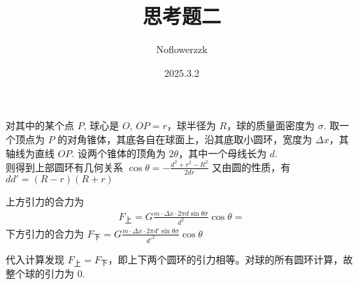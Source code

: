 \documentclass{article}
\title{思考题二}
\author{Noflowerzzk}
\date{2025.3.2}
\begin{document}
\maketitle

对其中的某个点 $P$, 球心是 $O$, $OP = r$，球半径为 $R$，球的质量面密度为 $\sigma$. 取一个顶点为 $P$ 的对角锥体，其底各自在球面上，沿其底取小圆环，宽度为 $\Delta x$，其轴线为直线 $OP$. 设两个锥体的顶角为 $2\theta$，其中一个母线长为 $d$. \\
则得到上部圆环有几何关系 
   $ \cos \theta = - \frac{d^2 + r^2 - R^2}{2dr} $
又由圆的性质，有 $d d' = (R - r) (R + r)$

上方引力的合力为 
\begin{align*}
    F_{\text{上}} = G\frac{m \cdot \Delta x \cdot 2\pi d\sin \theta \sigma}{d^2}\cos \theta = 
\end{align*}
下方引力的合力为 $F_{\text{下}} = G\frac{m \cdot \Delta x \cdot 2\pi d'\sin \theta \sigma}{d'^2}\cos \theta$

代入计算发现 $F_{\text{上}} = F_{\text{下}}$，即上下两个圆环的引力相等。对球的所有圆环计算，故整个球的引力为 $0$.
\end{document}
